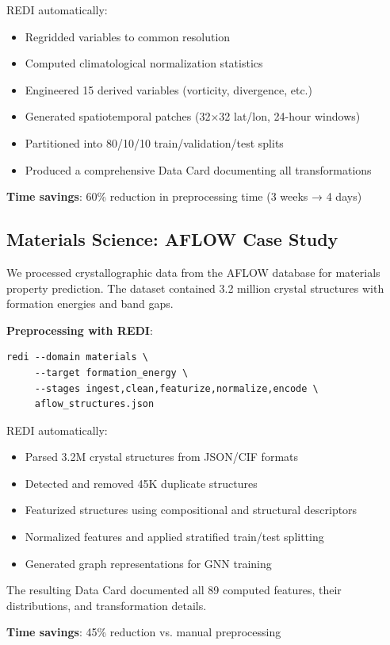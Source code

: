 \documentclass[11pt,letterpaper,twocolumn]{article}
\begin{document}
REDI automatically:
\begin{itemize}
    \item Regridded variables to common resolution
    \item Computed climatological normalization statistics
    \item Engineered 15 derived variables (vorticity, divergence, etc.)
    \item Generated spatiotemporal patches (32×32 lat/lon, 24-hour windows)
    \item Partitioned into 80/10/10 train/validation/test splits
    \item Produced a comprehensive Data Card documenting all transformations
\end{itemize}

\textbf{Time savings}: 60\% reduction in preprocessing time (3 weeks → 4 days)

\subsection{Materials Science: AFLOW Case Study}

We processed crystallographic data from the AFLOW database for materials property prediction. The dataset contained 3.2 million crystal structures with formation energies and band gaps.

\textbf{Preprocessing with REDI}:
\begin{verbatim}
redi --domain materials \
     --target formation_energy \
     --stages ingest,clean,featurize,normalize,encode \
     aflow_structures.json
\end{verbatim}

REDI automatically:
\begin{itemize}
    \item Parsed 3.2M crystal structures from JSON/CIF formats
    \item Detected and removed 45K duplicate structures
    \item Featurized structures using compositional and structural descriptors
    \item Normalized features and applied stratified train/test splitting
    \item Generated graph representations for GNN training
\end{itemize}

The resulting Data Card documented all 89 computed features, their distributions, and transformation details.

\textbf{Time savings}: 45\% reduction vs. manual preprocessing
\end{document}
